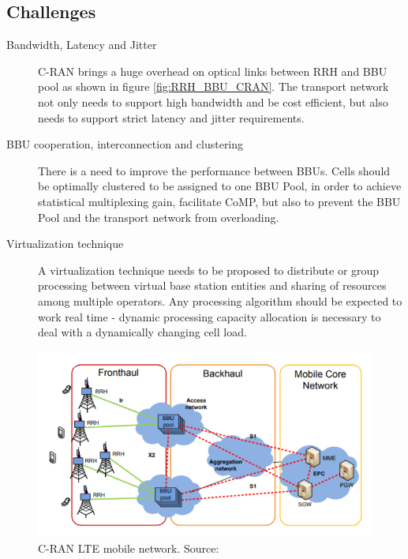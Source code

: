 \documentclass[notitlepage,hidelinks]{article}
\begin{document}

\subsection{Challenges}\nocite{checko14}

\begin{description}
    
    \item [Bandwidth, Latency and Jitter] C-RAN brings a huge
    overhead on optical links between RRH and BBU pool as shown
    in figure \ref{fig:RRH_BBU_CRAN}.
    The transport network not only needs to support high bandwidth 
    and be cost efficient, but also needs to support strict latency 
    and jitter requirements.
    
    \item [BBU cooperation, interconnection and clustering] 
    There is a need to improve the performance between BBUs. 
    Cells should be optimally clustered to be assigned to one
    BBU Pool, in order to achieve statistical multiplexing gain,
    facilitate CoMP, but also to prevent the BBU Pool and the
    transport network from overloading. 
    
    \item [Virtualization technique] A virtualization technique
    needs to be proposed to distribute or group processing between
    virtual base station entities and sharing of resources among 
    multiple operators. Any processing algorithm should be 
    expected to work real time - dynamic processing capacity 
    allocation is necessary to deal with a dynamically changing
    cell load.
    
\end{description}



\begin{figure}
  \includegraphics[scale=0.7]{res/LTE_CRAN.PNG}
    \caption{C-RAN LTE mobile network. Source: \parencite{checko14}}
  \label{fig:LTE_CRAN}
\end{figure}
\end{document}
